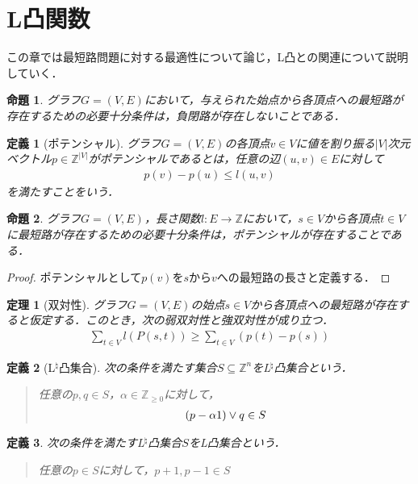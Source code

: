 \documentclass[uplatex]{jsarticle}
\newcommand{\paren}[1]{ \left( #1 \right) }
\newcommand{\abs}[1]{ \left| #1 \right| }
\newcommand{\Int}{\mathbb{Z}}
\theoremstyle{break}
\newtheorem{theo}{定理}[section]
\newtheorem{defi}{定義}[section]
\newtheorem{prop}{命題}[section]
\newtheorem{proof}{証明}[section]
\begin{document}
\section{L凸関数}
この章では最短路問題に対する最適性について論じ，L凸との関連について説明していく．
\begin{prop}
  グラフ$G=(V,E)$において，与えられた始点から各頂点への最短路が存在するための必要十分条件は，負閉路が存在しないことである．
\end{prop}
\begin{defi}[ポテンシャル] 
  グラフ$G=(V,E)$の各頂点$v\in V$に値を割り振る$\abs{V}$次元ベクトル$p \in \Int^{\abs{V}}$がポテンシャルであるとは，任意の辺$(u,v)\in E$に対して
  \begin{align*}
    p(v) - p(u) \leq l(u,v)
  \end{align*}
  を満たすことをいう．
\end{defi}
\begin{prop}
  グラフ$G=(V,E)$，長さ関数$l\colon E\to \Int$において，$s\in V$から各頂点$t\in V$に最短路が存在するための必要十分条件は，ポテンシャルが存在することである．
\end{prop}
\begin{proof}
  ポテンシャルとして$p(v)$を$s$から$v$への最短路の長さと定義する．
\end{proof}
\begin{theo}[双対性] 
  グラフ$G=(V,E)$の始点$s\in V$から各頂点への最短路が存在すると仮定する．このとき，次の弱双対性と強双対性が成り立つ．
  \begin{align*}
    \sum_{t\in V} l\paren{P(s,t)} \geq \sum_{t\in V} ( p(t) - p(s) )
  \end{align*}
\end{theo}
\begin{defi}[L${ }^\natural$凸集合] 
  次の条件を満たす集合$S\subseteq \Int^n$をL${ }^\natural$凸集合という．
  \begin{quote}
    任意の$p,q\in S$，$\alpha \in \Int_{\geq 0}$に対して，
    \begin{align*}
      (p-\alpha \boldmath{1}) \lor q \in S
    \end{align*}
  \end{quote}
\end{defi}
\begin{defi}
  次の条件を満たすL${}^\natural$凸集合$S$をL凸集合という．
  \begin{quote}
    任意の$p\in S$に対して，$p+1,p-1\in S$
  \end{quote}
\end{defi}
\end{document}
